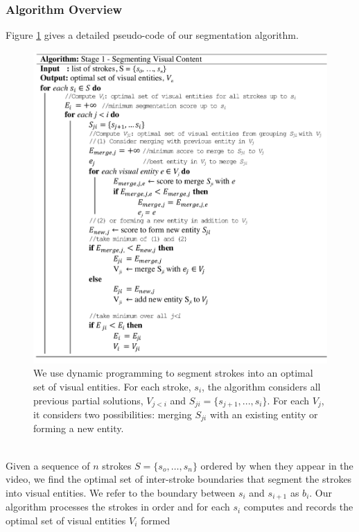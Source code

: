 \subsubsection{Algorithm Overview}
Figure \ref{Fig:pseudocode} gives a detailed pseudo-code of our segmentation algorithm.\\    
%
\begin{figure}[h!]
        \centering
        \includegraphics[width=\textwidth]{figures/pseudocode_image.pdf}
	\captionsetup{font=footnotesize}
        \caption{We use dynamic programming to segment strokes into an optimal
set of visual entities. For each stroke, $s_i$, the algorithm considers all previous
partial solutions, $V_{j<i}$ and $S_{ji}=\{s_{j+1}, ..., s_i\}$. For each
$V_j$, it considers two possibilities: merging $S_{ji}$ with an existing
entity or forming a new entity.}
        \label{Fig:pseudocode}
\end{figure}\\
%
Given a sequence of $n$ strokes $S = \{s_o,\dots,s_n\}$ ordered by
when they appear in the video, we find the optimal set of inter-stroke
boundaries that segment the strokes into visual entities. We refer to the boundary between $s_i$ and $s_{i+1}$ as
$b_i$.
%
Our algorithm processes the strokes in order and for each $s_i$
computes and records the optimal set of visual entities $V_i$ formed
